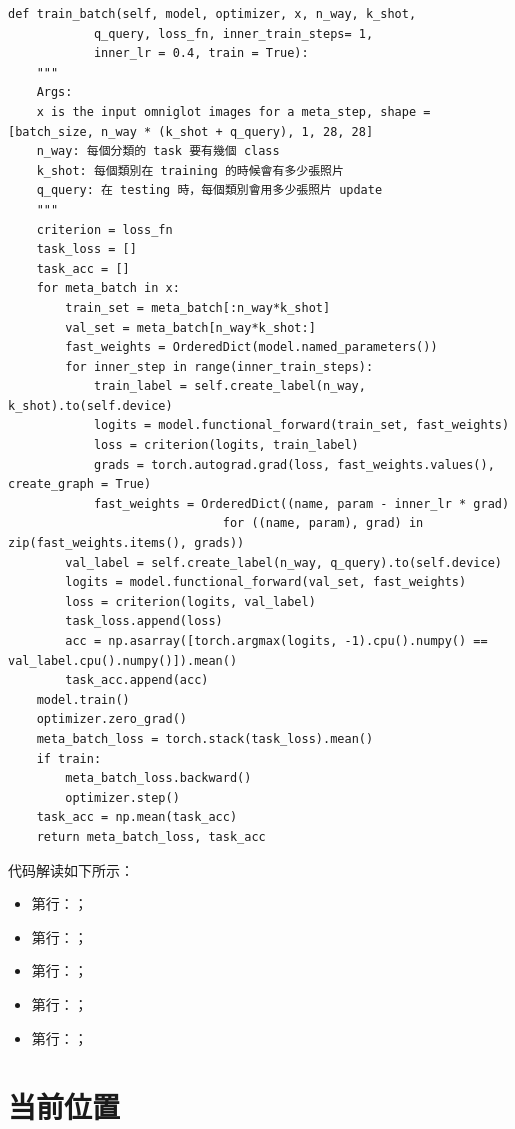 \begin{lstlisting}
def train_batch(self, model, optimizer, x, n_way, k_shot, 
            q_query, loss_fn, inner_train_steps= 1, 
            inner_lr = 0.4, train = True):
    """
    Args:
    x is the input omniglot images for a meta_step, shape = [batch_size, n_way * (k_shot + q_query), 1, 28, 28]
    n_way: 每個分類的 task 要有幾個 class
    k_shot: 每個類別在 training 的時候會有多少張照片
    q_query: 在 testing 時，每個類別會用多少張照片 update
    """
    criterion = loss_fn
    task_loss = []
    task_acc = []
    for meta_batch in x:
        train_set = meta_batch[:n_way*k_shot]
        val_set = meta_batch[n_way*k_shot:]
        fast_weights = OrderedDict(model.named_parameters())
        for inner_step in range(inner_train_steps):
            train_label = self.create_label(n_way, k_shot).to(self.device)
            logits = model.functional_forward(train_set, fast_weights)
            loss = criterion(logits, train_label)
            grads = torch.autograd.grad(loss, fast_weights.values(), create_graph = True)
            fast_weights = OrderedDict((name, param - inner_lr * grad)
                              for ((name, param), grad) in zip(fast_weights.items(), grads))
        val_label = self.create_label(n_way, q_query).to(self.device)
        logits = model.functional_forward(val_set, fast_weights)
        loss = criterion(logits, val_label)
        task_loss.append(loss)
        acc = np.asarray([torch.argmax(logits, -1).cpu().numpy() == val_label.cpu().numpy()]).mean()
        task_acc.append(acc)
    model.train()
    optimizer.zero_grad()
    meta_batch_loss = torch.stack(task_loss).mean()
    if train:
        meta_batch_loss.backward()
        optimizer.step()
    task_acc = np.mean(task_acc)
    return meta_batch_loss, task_acc
\end{lstlisting}
代码解读如下所示：
\begin{itemize}
\item 第行：；
\item 第行：；
\item 第行：；
\item 第行：；
\item 第行：；
\end{itemize}

















\section{当前位置}




